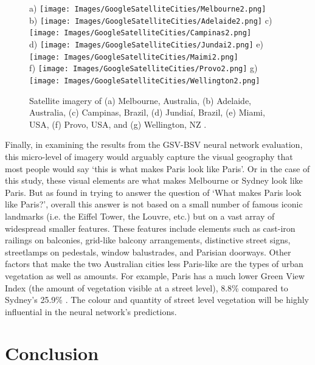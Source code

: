 \documentclass[sageh,times]{sagej}
\begin{document}
\begin{figure}[!htbp]
\centering    
a) \texttt{[image: Images/GoogleSatelliteCities/Melbourne2.png]} 
\\ b) \texttt{[image: Images/GoogleSatelliteCities/Adelaide2.png]} 
c) \texttt{[image: Images/GoogleSatelliteCities/Campinas2.png]} 
\\ d) \texttt{[image: Images/GoogleSatelliteCities/Jundai2.png]} 
e) \texttt{[image: Images/GoogleSatelliteCities/Maimi2.png]} 
\\ f) \texttt{[image: Images/GoogleSatelliteCities/Provo2.png]} 
g) \texttt{[image: Images/GoogleSatelliteCities/Wellington2.png]} 
 \caption{Satellite imagery of (a) Melbourne, Australia, (b) Adelaide, Australia, (c) Campinas, Brazil, (d) Jundia\'{i}, Brazil, (e) Miami, USA, (f) Provo, USA, and (g) Wellington, NZ \citep{GoogleStatic2017}.}    
 \label{fig:satimages}  
\end{figure} 

Finally, in examining the results from the GSV-BSV neural network evaluation, this micro-level of imagery would arguably capture the visual geography that most people would say `this is what makes Paris look like Paris'. Or in the case of this study, these visual elements are what makes Melbourne or Sydney look like Paris. But as \cite{Doersch2012} found in trying to answer the question of `What makes Paris look like Paris?', overall this answer is not based on a small number of famous iconic landmarks (i.e. the Eiffel Tower, the Louvre, etc.) but on a vast array of widespread smaller features. These features include elements such as cast-iron railings on balconies, grid-like balcony arrangements, distinctive street signs, streetlamps on pedestals, window balustrades, and Parisian doorways. Other factors that make the two Australian cities less Paris-like are the types of urban vegetation as well as amounts. For example, Paris has a much lower Green View Index (the amount of vegetation visible at a street level), 8.8\% compared to Sydney's 25.9\% \citep{Li2015}. The colour and quantity of street level vegetation will be highly influential in the neural network's predictions.



\section{Conclusion}\label{sec:conclusion}
\end{document}
